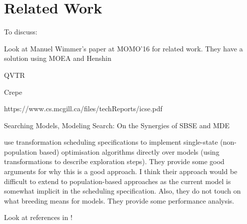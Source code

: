 \section{Related Work}
\label{section:related_work}

	\begin{draftlist}
		To discuss:
		\item Look at Manuel Wimmer's paper at MOMO'16 for related work. They have a solution using MOEA and Henshin
		\item QVTR
		\item Crepe
		\item https://www.cs.mcgill.ca/files/techReports/icse.pdf
		\item Searching Models, Modeling Search: On the Synergies of SBSE and MDE %
		\item \cite{Denil+14} use transformation scheduling specifications to implement single-state (non-population based) optimisation algorithms directly over models 
		      (using transformations to describe exploration steps). They provide some good arguments for why this is a good approach. I think their approach would be
					difficult to extend to population-based approaches as the current model is somewhat implicit in the scheduling specification. Also, they do not touch on
					what breeding means for models. They provide some performance analysis.
					
					Look at references in \cite{Denil+14}!
	\end{draftlist}
